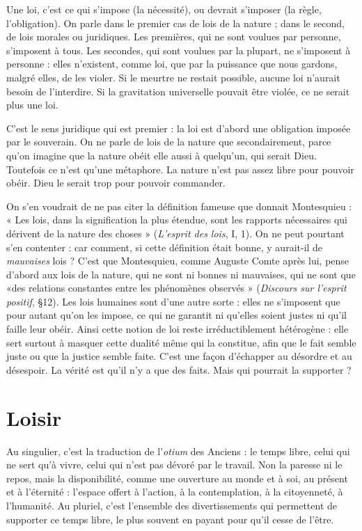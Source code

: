 {Une loi, c’est ce qui s'impose (la nécessité), ou devrait s'imposer (la règle,
l'obligation). On parle dans le premier cas de lois de la nature ; dans le second,
de lois morales ou juridiques. Les premières, qui ne sont voulues par personne,
s'imposent à tous. Les secondes, qui sont voulues par la plupart, ne s'imposent
à personne : elles n’existent, comme loi, que par la puissance que nous gardons,
malgré elles, de les violer. Si le meurtre ne restait possible, aucune loi n’aurait
besoin de l’interdire. Si la gravitation universelle pouvait être violée, ce ne serait
plus une loi.

C’est le sens juridique qui est premier : la loi est d’abord une obligation
imposée par le souverain. On ne parle de lois de la nature que secondairement,
parce qu’on imagine que la nature obéit elle aussi à quelqu'un, qui serait Dieu.
Toutefois ce n’est qu’une métaphore. La nature n’est pas assez libre pour pouvoir
obéir. Dieu le serait trop pour pouvoir commander.

On s’en voudrait de ne pas citer la définition fameuse que donnait
Montesquieu : « Les lois, dans la signification la plus étendue, sont les rapports
nécessaires qui dérivent de la nature des choses » ({\it L'esprit des lois}, I, 1). On ne
peut pourtant s’en contenter : car comment, si cette définition était bonne, y
aurait-il de {\it mauvaises} lois ? C’est que Montesquieu, comme Auguste Comte
après lui, pense d’abord aux lois de la nature, qui ne sont ni bonnes ni mauvaises,
qui ne sont que «des relations constantes entre les phénomènes
observés » ({\it Discours sur l'esprit positif}, \S 12). Les lois humaines sont d’une autre
sorte : elles ne s'imposent que pour autant qu’on les impose, ce qui ne garantit
ni qu’elles soient justes ni qu’il faille leur obéir. Ainsi cette notion de loi reste
irréductiblement hétérogène : elle sert surtout à masquer cette dualité même
qui la constitue, afin que le fait semble juste ou que la justice semble faite. C’est
une façon d’échapper au désordre et au désespoir. La vérité est qu’il n’y a que
des faits. Mais qui pourrait la supporter ?

\section{Loisir}
Au singulier, c’est la traduction de l’{\it otium} des Anciens : le temps
libre, celui qui ne sert qu’à vivre, celui qui n’est pas dévoré par le
travail. Non la paresse ni le repos, mais la disponibilité, comme une ouverture
au monde et à soi, au présent et à l'éternité : l’espace offert à l’action, à la
contemplation, à la citoyenneté, à l'humanité.
Au pluriel, c’est l’ensemble des divertissements qui permettent de supporter
ce temps libre, le plus souvent en payant pour qu’il cesse de l’être.

}
